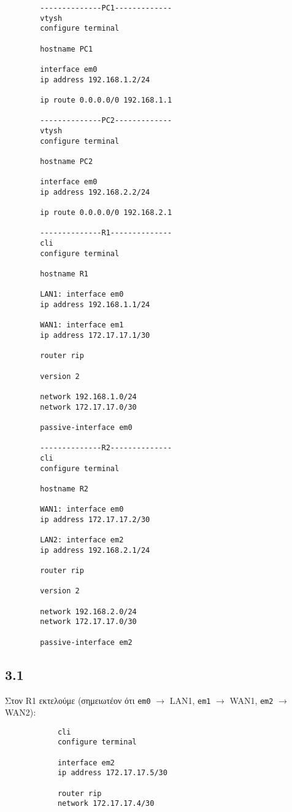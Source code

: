 \documentclass[a4paper, 12pt]{article}
\begin{document}
	\begin{verbatim}
		--------------PC1-------------
		vtysh
		configure terminal
		
		hostname PC1
		
		interface em0
		ip address 192.168.1.2/24
		
		ip route 0.0.0.0/0 192.168.1.1 
		
		--------------PC2-------------
		vtysh
		configure terminal
		
		hostname PC2
		
		interface em0
		ip address 192.168.2.2/24
		
		ip route 0.0.0.0/0 192.168.2.1
		
		--------------R1--------------
		cli
		configure terminal
		
		hostname R1
		
		LAN1: interface em0
		ip address 192.168.1.1/24
		
		WAN1: interface em1
		ip address 172.17.17.1/30
		
		router rip
		
		version 2
		
		network 192.168.1.0/24
		network 172.17.17.0/30
		
		passive-interface em0
		
		--------------R2--------------
		cli
		configure terminal
		
		hostname R2
		
		WAN1: interface em0
		ip address 172.17.17.2/30
		
		LAN2: interface em2 
		ip address 192.168.2.1/24
		
		router rip
		
		version 2
		
		network 192.168.2.0/24
		network 172.17.17.0/30
		
		passive-interface em2
	\end{verbatim}
	
	\subsection*{3.1}
		Στον R1 εκτελούμε (σημειωτέον ότι \verb|em0| $\rightarrow$ LAN1, \verb|em1| $\rightarrow$ WAN1, \verb|em2| $\rightarrow$ WAN2):
		
		\begin{verbatim}
			cli 
			configure terminal
			
			interface em2
			ip address 172.17.17.5/30
			
			router rip
			network 172.17.17.4/30
		\end{verbatim}
\end{document}
